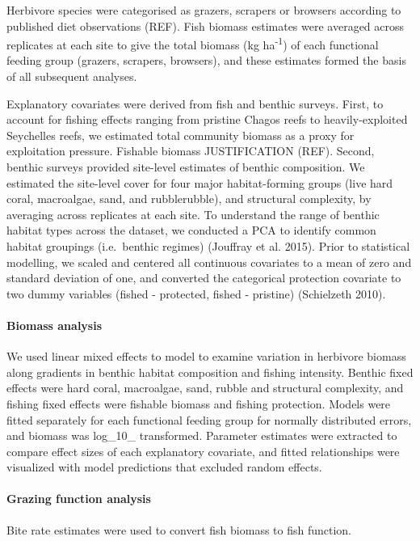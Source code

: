 \documentclass[]{article}
\let\oldparagraph\paragraph
\renewcommand{\paragraph}[1]{\oldparagraph{#1}\mbox{}}
\begin{document}
Herbivore species were categorised as grazers, scrapers or browsers
according to published diet observations (REF). Fish biomass estimates
were averaged across replicates at each site to give the total biomass
(kg ha\textsuperscript{-1}) of each functional feeding group (grazers,
scrapers, browsers), and these estimates formed the basis of all
subsequent analyses.

Explanatory covariates were derived from fish and benthic surveys.
First, to account for fishing effects ranging from pristine Chagos reefs
to heavily-exploited Seychelles reefs, we estimated total community
biomass as a proxy for exploitation pressure. Fishable biomass
JUSTIFICATION (REF). Second, benthic surveys provided site-level
estimates of benthic composition. We estimated the site-level cover for
four major habitat-forming groups (live hard coral, macroalgae, sand,
and rubblerubble), and structural complexity, by averaging across
replicates at each site. To understand the range of benthic habitat
types across the dataset, we conducted a PCA to identify common habitat
groupings (i.e.~benthic regimes) (Jouffray et al. 2015). Prior to
statistical modelling, we scaled and centered all continuous covariates
to a mean of zero and standard deviation of one, and converted the
categorical protection covariate to two dummy variables (fished -
protected, fished - pristine) (Schielzeth 2010).

\paragraph{Biomass analysis}\label{biomass-analysis}

We used linear mixed effects to model to examine variation in herbivore
biomass along gradients in benthic habitat composition and fishing
intensity. Benthic fixed effects were hard coral, macroalgae, sand,
rubble and structural complexity, and fishing fixed effects were
fishable biomass and fishing protection. Models were fitted separately
for each functional feeding group for normally distributed errors, and
biomass was log\_10\_ transformed. Parameter estimates were extracted to
compare effect sizes of each explanatory covariate, and fitted
relationships were visualized with model predictions that excluded
random effects.

\paragraph{Grazing function analysis}\label{grazing-function-analysis}

Bite rate estimates were used to convert fish biomass to fish function.
\end{document}
